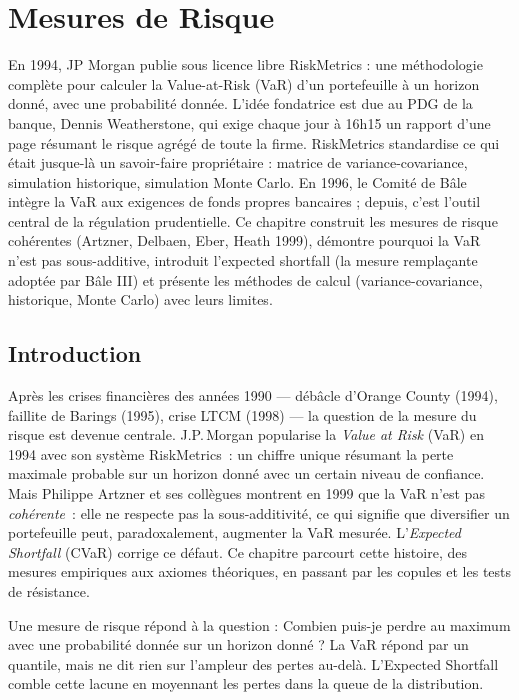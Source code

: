 \chapter{Mesures de Risque}
\label{ch:risque}

En 1994, JP Morgan publie sous licence libre RiskMetrics : une méthodologie complète pour calculer la Value-at-Risk (VaR) d'un portefeuille à un horizon donné, avec une probabilité donnée. L'idée fondatrice est due au PDG de la banque, Dennis Weatherstone, qui exige chaque jour à 16h15 un rapport d'une page résumant le risque agrégé de toute la firme. RiskMetrics standardise ce qui était jusque-là un savoir-faire propriétaire : matrice de variance-covariance, simulation historique, simulation Monte Carlo. En 1996, le Comité de Bâle intègre la VaR aux exigences de fonds propres bancaires ; depuis, c'est l'outil central de la régulation prudentielle. Ce chapitre construit les mesures de risque cohérentes (Artzner, Delbaen, Eber, Heath 1999), démontre pourquoi la VaR n'est pas sous-additive, introduit l'expected shortfall (la mesure remplaçante adoptée par Bâle III) et présente les méthodes de calcul (variance-covariance, historique, Monte Carlo) avec leurs limites.

\section{Introduction}

Apr\`es les crises financi\`eres des ann\'ees 1990 --- d\'eb\^acle d'Orange County (1994), faillite de Barings (1995), crise LTCM (1998) --- la question de la mesure du risque est devenue centrale. J.P.\,Morgan popularise la \emph{Value at Risk} (VaR) en 1994 avec son syst\`eme RiskMetrics~: un chiffre unique r\'esumant la perte maximale probable sur un horizon donn\'e avec un certain niveau de confiance. Mais Philippe Artzner et ses coll\`egues montrent en 1999 que la VaR n'est pas \emph{coh\'erente}~: elle ne respecte pas la sous-additivit\'e, ce qui signifie que diversifier un portefeuille peut, paradoxalement, augmenter la VaR mesur\'ee. L'\emph{Expected Shortfall} (CVaR) corrige ce d\'efaut. Ce chapitre parcourt cette histoire, des mesures empiriques aux axiomes th\'eoriques, en passant par les copules et les tests de r\'esistance.

\begin{intuition}
Une mesure de risque r\'epond \`a la question : \og Combien puis-je perdre au
maximum avec une probabilit\'e donn\'ee sur un horizon donn\'e ? \fg La VaR
r\'epond par un quantile, mais ne dit rien sur l'ampleur des pertes au-del\`a.
L'Expected Shortfall comble cette lacune en moyennant les pertes dans la queue
de la distribution.
\end{intuition}


